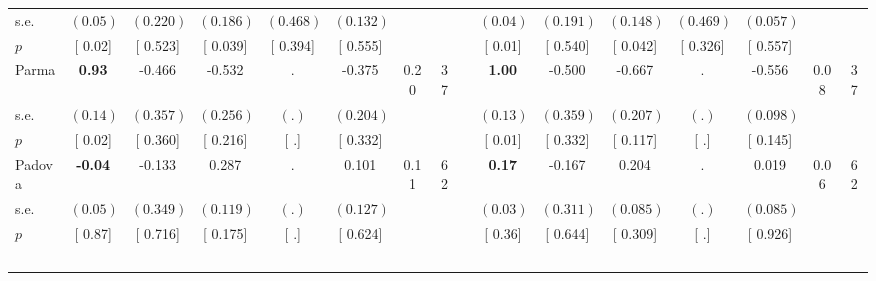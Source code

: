 \begin{longtable}{L{8em} c c c c c c c p{1em} c c c c c c c}
\quad \quad \quad \quad s.e.& $ (     0.05)$ & $ (    0.220)$ & $ (    0.186)$ & $ (    0.468)$ & $ (    0.132)$ & & & & $ (     0.04)$ & $ (    0.191)$ & $ (    0.148)$ & $ (    0.469)$ & $ (    0.057)$ & &  \\*
\quad \quad \quad \quad $ p$ & [     0.02] & [    0.523] & [    0.039] & [    0.394] & [    0.555] & & & & [     0.01] & [    0.540] & [    0.042] & [    0.326] & [    0.557] & &  \\[1em]
\quad \quad \quad Parma& \textbf{     0.93} &    -0.466 &    -0.532 &         . &    -0.375 &      0.20 &        37 & & \textbf{     1.00} &    -0.500 &    -0.667 &         . &    -0.556 &      0.08 &        37  \\*
\quad \quad \quad \quad s.e.& $ (     0.14)$ & $ (    0.357)$ & $ (    0.256)$ & $ (        .)$ & $ (    0.204)$ & & & & $ (     0.13)$ & $ (    0.359)$ & $ (    0.207)$ & $ (        .)$ & $ (    0.098)$ & &  \\*
\quad \quad \quad \quad $ p$ & [     0.02] & [    0.360] & [    0.216] & [        .] & [    0.332] & & & & [     0.01] & [    0.332] & [    0.117] & [        .] & [    0.145] & &  \\[1em]
\quad \quad \quad Padova& \textbf{    -0.04} &    -0.133 &     0.287 &         . &     0.101 &      0.11 &        62 & & \textbf{     0.17} &    -0.167 &     0.204 &         . &     0.019 &      0.06 &        62  \\*
\quad \quad \quad \quad s.e.& $ (     0.05)$ & $ (    0.349)$ & $ (    0.119)$ & $ (        .)$ & $ (    0.127)$ & & & & $ (     0.03)$ & $ (    0.311)$ & $ (    0.085)$ & $ (        .)$ & $ (    0.085)$ & &  \\*
\quad \quad \quad \quad $ p$ & [     0.87] & [    0.716] & [    0.175] & [        .] & [    0.624] & & & & [     0.36] & [    0.644] & [    0.309] & [        .] & [    0.926] & &  \\[1em]
~\\[1em]
\end{longtable}